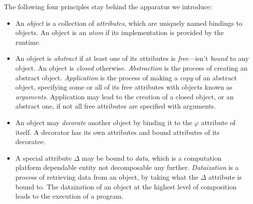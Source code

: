 The following four principles stay behind the
apparatus we introduce:

\begin{itemize}
\item An \emph{object} is a collection of \emph{attributes},
which are uniquely named bindings to objects. An object
is an \emph{atom} if its implementation is provided by the runtime.

\item An object is \emph{abstract} if at least one of its attributes
is \emph{free}---isn't \emph{bound} to any object. An object
is \emph{closed} otherwise.
\emph{Abstraction} is the process of creating an abstract object.
\emph{Application} is the process of making a \emph{copy} of an abstract
object, specifying some or all of its free attributes with
objects known as \emph{arguments}. Application may lead to the
creation of a closed object, or an abstract one, if not all free
attributes are specified with arguments.

\item An object may \emph{decorate} another object by binding it
to the $\varphi$ attribute of itself. A decorator has its
own attributes and bound attributes of its decoratee.

\item A special attribute $\Delta$ may be bound to \emph{data},
which is a computation platform dependable entity not
decomposable any further.
\emph{Dataization} is a process of retrieving data from an object,
by taking what the $\Delta$ attribute is bound to.
The dataization of an object at the highest level of composition
leads to the execution of a program.
\end{itemize}

